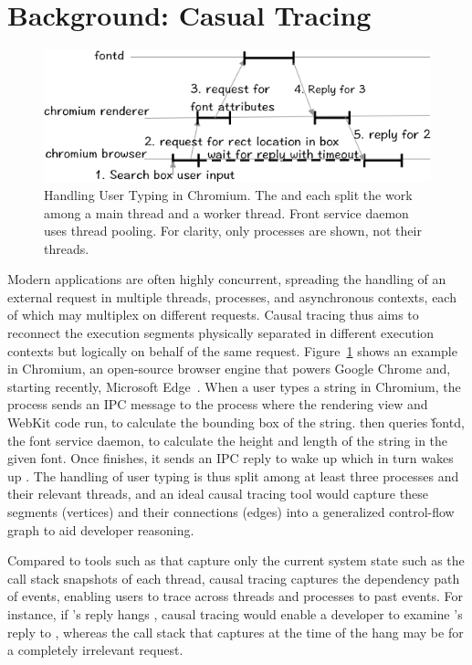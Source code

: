 \section{Background: Casual Tracing} \label{sec:background}

\begin{figure}[tb]
	\footnotesize
    \centering
	 \includegraphics[width=\columnwidth]{./figures/causaltracing_example.png}
    \caption{Handling User Typing in Chromium.  The  and
       each split the work among a main thread and a worker
      thread.  Front service daemon  uses thread pooling.  For
      clarity, only processes are shown, not their threads.}
    \label{fig:chromium-normal}
\end{figure}

Modern applications are often highly concurrent, spreading the handling of
an external request in multiple threads, processes, and asynchronous
contexts, each of which may multiplex on different requests.  Causal
tracing thus aims to reconnect the execution segments physically separated
in different execution contexts but logically on behalf of the same
request.  Figure~\ref{fig:chromium-normal} shows an example in Chromium,
an open-source browser engine that powers Google Chrome and, starting
recently, Microsoft Edge~\cite{chromiumurl}. When a user types a string in
Chromium, the  process sends an IPC message to the 
process where the rendering view and WebKit code run, to calculate the
bounding box of the string.   then queries \v{fontd}, the font
service daemon, to calculate the height and length of the string in the
given font.  Once  finishes, it sends an IPC reply to wake up
 which in turn wakes up .  The handling of user
typing is thus split among at least three processes and their relevant
threads, and an ideal causal tracing tool would capture these segments
(vertices) and their connections (edges) into a generalized control-flow
graph to aid developer reasoning.

Compared to tools such as \spindump that capture only the current system
state such as the call stack snapshots of each thread, causal tracing
captures the dependency path of events, enabling users to trace across
threads and processes to past events.  For instance, if 's
reply hangs , causal tracing would enable a developer to
examine 's reply to , whereas the  call
stack that \spindump captures at the time of the hang may be for a
completely irrelevant request.

